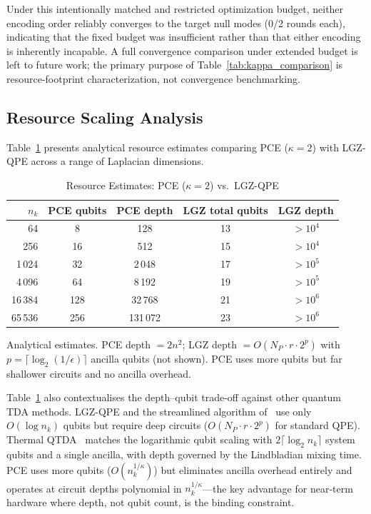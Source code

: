 \documentclass[conference,10pt]{IEEEtran}
\begin{document}
Under this intentionally matched and restricted optimization budget,
neither encoding order reliably converges to the target null modes
(0/2 rounds each), indicating that the fixed budget was insufficient
rather than that either encoding is inherently incapable. A full
convergence comparison under extended budget is left to future work;
the primary purpose of Table~\ref{tab:kappa_comparison} is
resource-footprint characterization, not convergence benchmarking.

\subsection{Resource Scaling Analysis}

Table~\ref{tab:resources} presents analytical resource estimates
comparing PCE ($\kappa{=}2$) with LGZ-QPE across a range of Laplacian
dimensions.

\begin{table}[t]
\caption{Resource Estimates: PCE ($\kappa{=}2$) vs.\ LGZ-QPE}
\label{tab:resources}
\centering
\begin{tabular}{rcccc}
\toprule
$n_k$ & PCE qubits & PCE depth & LGZ total qubits & LGZ depth \\
\midrule
64      &   8  &     128  & 13 & $>10^4$ \\
256     &  16  &     512  & 15 & $>10^4$ \\
1\,024  &  32  &   2\,048 & 17 & $>10^5$ \\
4\,096  &  64  &   8\,192 & 19 & $>10^5$ \\
16\,384 & 128  &  32\,768 & 21 & $>10^6$ \\
65\,536 & 256  & 131\,072 & 23 & $>10^6$ \\
\bottomrule
\end{tabular}
\par\smallskip
{\footnotesize Analytical estimates. PCE depth $= 2n^2$; LGZ depth
$= O(N_P \cdot r \cdot 2^p)$ with $p = \lceil\log_2(1/\epsilon)\rceil$
ancilla qubits (not shown). PCE uses more qubits but far shallower
circuits and no ancilla overhead.}
\end{table}

Table~\ref{tab:resources} also contextualises the depth--qubit
trade-off against other quantum TDA methods. LGZ-QPE and the
streamlined algorithm of~\cite{McArdle22} use only $O(\log n_k)$
qubits but require deep circuits ($O(N_P \cdot r \cdot 2^p)$ for
standard QPE). Thermal QTDA~\cite{Scali24} matches the logarithmic
qubit scaling with $2\lceil\log_2 n_k\rceil$ system qubits and a
single ancilla, with depth governed by the Lindbladian mixing time.
PCE uses more qubits ($O(n_k^{1/\kappa})$) but eliminates ancilla
overhead entirely and operates at circuit depths polynomial in
$n_k^{1/\kappa}$---the key advantage for near-term hardware where
depth, not qubit count, is the binding constraint.
\end{document}
